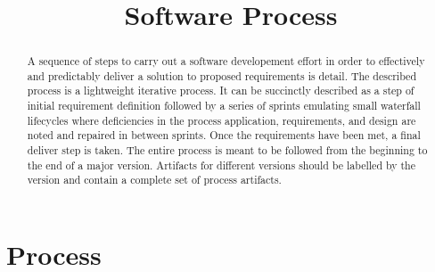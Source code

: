 \documentclass{article}
\begin{document}
\title{Software Process}

\maketitle

\begin{abstract}
	A sequence of steps to carry out a software developement effort in order
	to effectively and predictably deliver a solution to proposed
	requirements is detail. The described process is a lightweight
	iterative process. It can be succinctly described as a step of initial
	requirement definition followed by a series of sprints emulating small
	waterfall lifecycles where deficiencies in the process application,
	requirements, and design are noted and repaired in between sprints. Once
	the requirements have been met, a final deliver step is taken. The
	entire process is meant to be followed from the beginning to the end of
	a major version. Artifacts for different versions should be labelled
	by the version and contain a complete set of process artifacts.
\end{abstract}

\section{Process}
\end{document}
